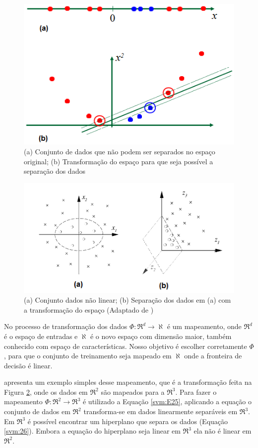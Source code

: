 \begin{figure}[htb]
	\centering
	\includegraphics[scale=0.5]{./figuras/1d-to-2d-svm.png}
	\caption{(a) Conjunto de dados que não podem ser separados no espaço original; (b) Transformação do espaço para que seja possível a separação dos dados}
	\label{fig:1d-to-2d-svm}
\end{figure}

\begin{figure}[htb]
	\centering
	\includegraphics[scale=0.8]{./figuras/2d-to-3d.png}
	\caption{(a) Conjunto dados não linear; (b) Separação dos dados em (a) com a transformação do espaço (Adaptado de \cite{Muller2001})}
	\label{fig:2d-to-3d}
\end{figure}

No processo de transformação dos dados $\Phi: \Re^{d} \rightarrow \aleph$ é um mapeamento, onde $\Re^{d}$ é o espaço de entradas e $\aleph$ é o novo espaço com dimensão maior, também conhecido com espaço de características. Nosso objetivo é escolher corretamente $\Phi$, para que o conjunto de treinamento seja mapeado em $\aleph$ onde a fronteira de decisão é linear.

\cite{Muller2001} apresenta um exemplo simples desse mapeamento, que é a transformação feita na Figura \ref{fig:2d-to-3d}, onde os dados em $\Re^2$ são mapeados para a $\Re^3$. Para fazer o mapeamento $\Phi:\Re^2 \rightarrow \Re^3$ é utilizado a Equação \ref{svm:E25}, aplicando a equação o conjunto de dados em $\Re^2$ transforma-se em dados linearmente separáveis em $\Re^3$. Em $\Re^3$ é possível encontrar um hiperplano que separa os dados (Equação \ref{svm:26}). Embora a equação do hiperplano seja linear em $\Re^3$ ela não é linear em $\Re^2$.

